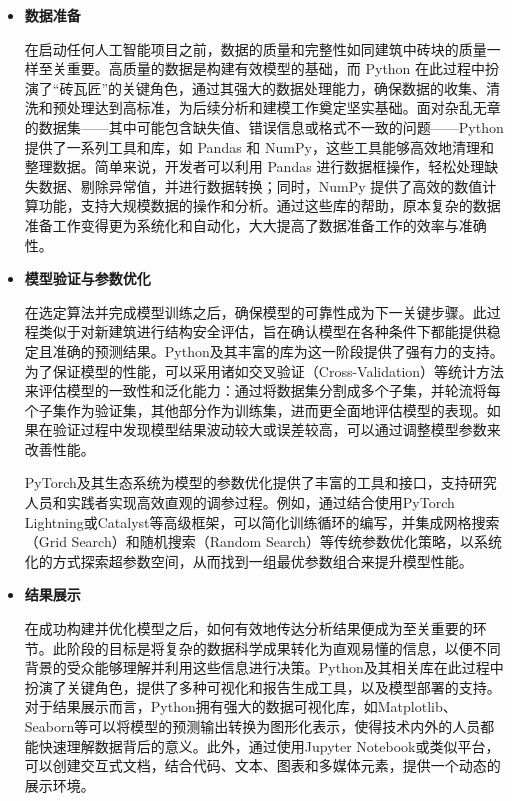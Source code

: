 \begin{itemize}
\item \textbf{数据准备}

在启动任何人工智能项目之前，数据的质量和完整性如同建筑中砖块的质量一样至关重要。高质量的数据是构建有效模型的基础，而 Python 在此过程中扮演了“砖瓦匠”的关键角色，通过其强大的数据处理能力，确保数据的收集、清洗和预处理达到高标准，为后续分析和建模工作奠定坚实基础。面对杂乱无章的数据集——其中可能包含缺失值、错误信息或格式不一致的问题——Python 提供了一系列工具和库，如 Pandas 和 NumPy，这些工具能够高效地清理和整理数据。简单来说，开发者可以利用 Pandas 进行数据框操作，轻松处理缺失数据、剔除异常值，并进行数据转换；同时，NumPy 提供了高效的数值计算功能，支持大规模数据的操作和分析。通过这些库的帮助，原本复杂的数据准备工作变得更为系统化和自动化，大大提高了数据准备工作的效率与准确性。



\item \textbf{模型验证与参数优化}

在选定算法并完成模型训练之后，确保模型的可靠性成为下一关键步骤。此过程类似于对新建筑进行结构安全评估，旨在确认模型在各种条件下都能提供稳定且准确的预测结果。Python及其丰富的库为这一阶段提供了强有力的支持。为了保证模型的性能，可以采用诸如交叉验证（Cross-Validation）等统计方法来评估模型的一致性和泛化能力：通过将数据集分割成多个子集，并轮流将每个子集作为验证集，其他部分作为训练集，进而更全面地评估模型的表现。如果在验证过程中发现模型结果波动较大或误差较高，可以通过调整模型参数来改善性能。

PyTorch及其生态系统为模型的参数优化提供了丰富的工具和接口，支持研究人员和实践者实现高效直观的调参过程。例如，通过结合使用PyTorch Lightning或Catalyst等高级框架，可以简化训练循环的编写，并集成网格搜索（Grid Search）和随机搜索（Random Search）等传统参数优化策略，以系统化的方式探索超参数空间，从而找到一组最优参数组合来提升模型性能。

\item \textbf{结果展示}

在成功构建并优化模型之后，如何有效地传达分析结果便成为至关重要的环节。此阶段的目标是将复杂的数据科学成果转化为直观易懂的信息，以便不同背景的受众能够理解并利用这些信息进行决策。Python及其相关库在此过程中扮演了关键角色，提供了多种可视化和报告生成工具，以及模型部署的支持。对于结果展示而言，Python拥有强大的数据可视化库，如Matplotlib、Seaborn等可以将模型的预测输出转换为图形化表示，使得技术内外的人员都能快速理解数据背后的意义。此外，通过使用Jupyter Notebook或类似平台，可以创建交互式文档，结合代码、文本、图表和多媒体元素，提供一个动态的展示环境。

\end{itemize}

